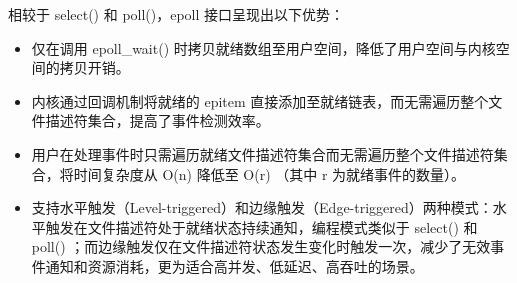 {\begin{enumerate}[label=\arabic*.]
              相较于 select() 和 poll()，epoll 接口呈现出以下优势：
              \begin{itemize}
                  \item 仅在调用 epoll\_wait() 时拷贝就绪数组至用户空间，降低了用户空间与内核空间的拷贝开销。
                  \item 内核通过回调机制将就绪的 epitem 直接添加至就绪链表，而无需遍历整个文件描述符集合，提高了事件检测效率。
                  \item 用户在处理事件时只需遍历就绪文件描述符集合而无需遍历整个文件描述符集合，将时间复杂度从 O(n) 降低至 O(r) （其中 r 为就绪事件的数量）。
                  \item 支持水平触发（Level-triggered）和边缘触发（Edge-triggered）两种模式：水平触发在文件描述符处于就绪状态持续通知，编程模式类似于 select() 和 poll() ；而边缘触发仅在文件描述符状态发生变化时触发一次，减少了无效事件通知和资源消耗，更为适合高并发、低延迟、高吞吐的场景。
              \end{itemize}


\end{enumerate}}
